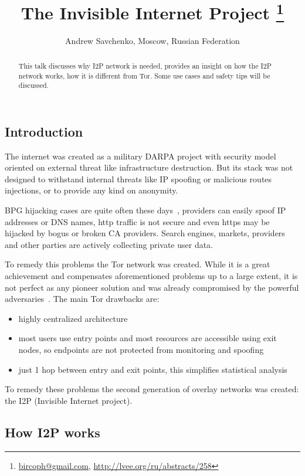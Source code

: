 \documentclass[10pt, a5paper]{article}
\begin{document}
\title{The Invisible Internet Project
\footnote{\url{bircoph@gmail.com}, \url{http://lvee.org/ru/abstracts/258}}}
\author{Andrew Savchenko, Moscow, Russian Federation}
\maketitle
\begin{abstract}
This talk discusses why I2P network is needed, provides an insight on how the I2P network works, how it is different from Tor. Some use cases and safety tips will be discussed.
\end{abstract}
\subsection*{Introduction}

The internet was created as a military DARPA project with security model oriented on external threat like infrastructure destruction. But its stack was not designed to withstand internal threats like IP spoofing or malicious routes injections, or to provide any kind on anonymity.

BPG hijacking cases are quite often these days~\cite{Savchenko-1}, providers can easily spoof IP addresses or DNS names, http traffic is not secure and even https may be hijacked by bogus or broken CA providers. Search engines, markets, providers and other parties are actively collecting private user data.

To remedy this problems the Tor network was created. While it is a great achievement and compensates aforementioned problems up to a large extent, it is not perfect as any pioneer solution and was already compromised by the powerful adversaries~\cite{Savchenko-2}. The main Tor drawbacks are:

\begin{itemize}
  \item highly centralized architecture
  \item most users use entry points and most resources are accessible using exit nodes, so endpoints are not protected from monitoring and spoofing
  \item just 1 hop between entry and exit points, this simplifies statistical analysis
\end{itemize}

To remedy these problems the second generation of overlay networks was created: the I2P (Invisible Internet project).

\subsection*{How I2P works}
\end{document}
